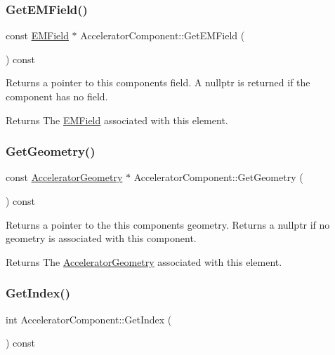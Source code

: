 \subsubsection{\texorpdfstring{Get\+E\+M\+Field()}{GetEMField()}}
{\footnotesize\ttfamily const \hyperlink{classEMField}{E\+M\+Field} $\ast$ Accelerator\+Component\+::\+Get\+E\+M\+Field (\begin{DoxyParamCaption}{ }\end{DoxyParamCaption}) const\hspace{0.3cm}{\ttfamily [inline]}}

Returns a pointer to this components field. A nullptr is returned if the component has no field. \begin{DoxyReturn}{Returns}
The \hyperlink{classEMField}{E\+M\+Field} associated with this element. 
\end{DoxyReturn}
\mbox{\label{classAcceleratorComponent_ac75cb2f0dca9d9ccd2d824a0686bb348}} 
\subsubsection{\texorpdfstring{Get\+Geometry()}{GetGeometry()}}
{\footnotesize\ttfamily const \hyperlink{classAcceleratorGeometry}{Accelerator\+Geometry} $\ast$ Accelerator\+Component\+::\+Get\+Geometry (\begin{DoxyParamCaption}{ }\end{DoxyParamCaption}) const\hspace{0.3cm}{\ttfamily [inline]}}

Returns a pointer to the this components geometry. Returns a nullptr if no geometry is associated with this component. \begin{DoxyReturn}{Returns}
The \hyperlink{classAcceleratorGeometry}{Accelerator\+Geometry} associated with this element. 
\end{DoxyReturn}
\mbox{\label{classAcceleratorComponent_abd1490171ac9af6004d3da01fb3b95fb}} 
\subsubsection{\texorpdfstring{Get\+Index()}{GetIndex()}}
{\footnotesize\ttfamily int Accelerator\+Component\+::\+Get\+Index (\begin{DoxyParamCaption}{ }\end{DoxyParamCaption}) const\hspace{0.3cm}{\ttfamily [virtual]}}

